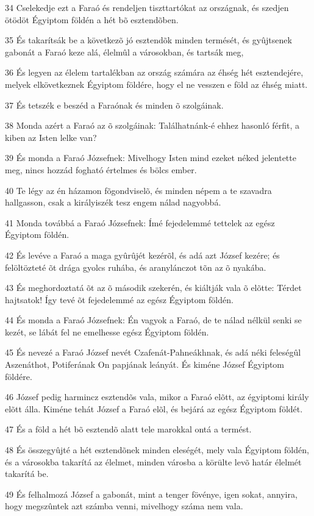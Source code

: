 \par 34 Cselekedje ezt a Faraó és rendeljen tiszttartókat az országnak, és szedjen ötödöt Égyiptom földén a hét bõ esztendõben.
\par 35 És takarítsák be a következõ jó esztendõk minden termését, és gyûjtsenek gabonát a Faraó keze alá, élelmûl a városokban, és tartsák meg,
\par 36 És legyen az élelem tartalékban az ország számára az éhség hét esztendejére, melyek elkövetkeznek Égyiptom földére, hogy el ne vesszen e föld az éhség miatt.
\par 37 És tetszék e beszéd a Faraónak és minden õ szolgáinak.
\par 38 Monda azért a Faraó az õ szolgáinak: Találhatnánk-é ehhez hasonló férfit, a kiben az Isten lelke van?
\par 39 És monda a Faraó Józsefnek: Mivelhogy Isten mind ezeket néked jelentette meg, nincs hozzád fogható értelmes és bölcs ember.
\par 40 Te légy az én házamon fõgondviselõ, és minden népem a te szavadra hallgasson, csak a királyiszék tesz engem nálad nagyobbá.
\par 41 Monda továbbá a Faraó Józsefnek: Ímé fejedelemmé tettelek az egész Égyiptom földén.
\par 42 És levéve a Faraó a maga gyûrûjét kezérõl, és adá azt József kezére; és felöltözteté õt drága gyolcs ruhába, és aranylánczot tõn az õ nyakába.
\par 43 És meghordoztatá õt az õ második szekerén, és kiáltják vala õ elõtte: Térdet hajtsatok! Így tevé õt fejedelemmé az egész Égyiptom földén.
\par 44 És monda a Faraó Józsefnek: Én vagyok a Faraó, de te nálad nélkül senki se kezét, se lábát fel ne emelhesse egész Égyiptom földén.
\par 45 És nevezé a Faraó József nevét Czafenát-Pahneákhnak, és adá néki feleségûl Aszenáthot, Potiferának On papjának leányát. És kiméne József Égyiptom földére.
\par 46 József pedig harmincz esztendõs vala, mikor a Faraó elõtt, az égyiptomi király elõtt álla. Kiméne tehát József a Faraó elõl, és bejárá az egész Égyiptom földét.
\par 47 És a föld a hét bõ esztendõ alatt tele marokkal ontá a termést.
\par 48 És összegyûjté a hét esztendõnek minden eleségét, mely vala Égyiptom földén, és a városokba takarítá az élelmet, minden városba a körülte levõ határ élelmét takarítá be.
\par 49 És felhalmozá József a gabonát, mint a tenger fövénye, igen sokat, annyira, hogy megszûntek azt számba venni, mivelhogy száma nem vala.
